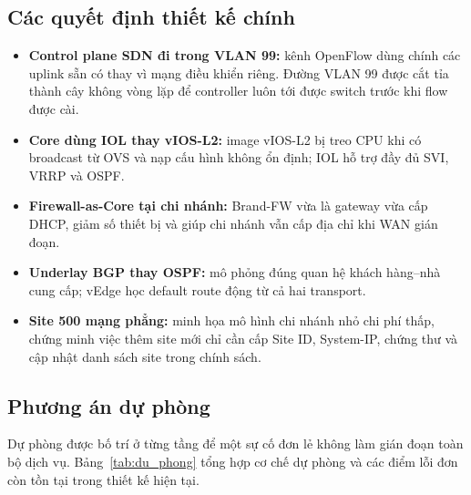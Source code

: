 \subsection{Các quyết định thiết kế chính}

\begin{itemize}
    \item \textbf{Control plane SDN đi trong VLAN 99:} kênh OpenFlow dùng chính các uplink sẵn có thay vì mạng điều khiển riêng. Đường VLAN 99 được cắt tỉa thành cây không vòng lặp để controller luôn tới được switch trước khi flow được cài.
    \item \textbf{Core dùng IOL thay vIOS-L2:} image vIOS-L2 bị treo CPU khi có broadcast từ OVS và nạp cấu hình không ổn định; IOL hỗ trợ đầy đủ SVI, VRRP và OSPF.
    \item \textbf{Firewall-as-Core tại chi nhánh:} Brand-FW vừa là gateway vừa cấp DHCP, giảm số thiết bị và giúp chi nhánh vẫn cấp địa chỉ khi WAN gián đoạn.
    \item \textbf{Underlay BGP thay OSPF:} mô phỏng đúng quan hệ khách hàng--nhà cung cấp; vEdge học default route động từ cả hai transport.
    \item \textbf{Site 500 mạng phẳng:} minh họa mô hình chi nhánh nhỏ chi phí thấp, chứng minh việc thêm site mới chỉ cần cấp Site ID, System-IP, chứng thư và cập nhật danh sách site trong chính sách.
\end{itemize}

\subsection{Phương án dự phòng}

Dự phòng được bố trí ở từng tầng để một sự cố đơn lẻ không làm gián đoạn toàn bộ dịch vụ. Bảng~\ref{tab:du_phong} tổng hợp cơ chế dự phòng và các điểm lỗi đơn còn tồn tại trong thiết kế hiện tại.

